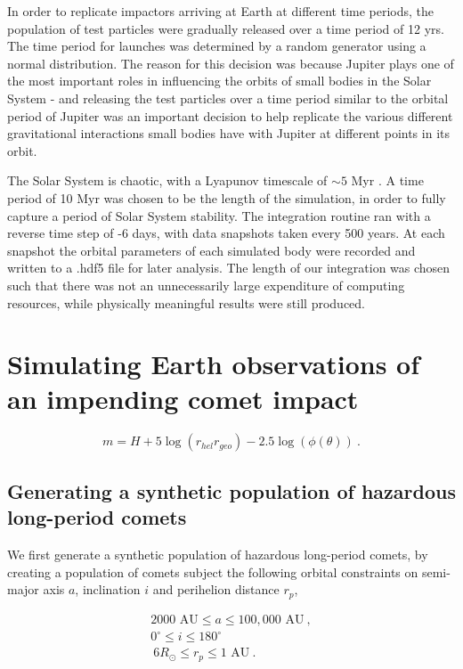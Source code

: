 In order to replicate impactors arriving at Earth at different time periods, the population of test particles were gradually released over a time period of 12 yrs. The time period for launches was determined by a random generator using a normal distribution.  The reason for this decision was because Jupiter plays one of the most important roles in influencing the orbits of small bodies in the Solar System - and releasing the test particles over a time period similar to the orbital period of Jupiter was an important decision to help replicate the various different gravitational interactions small bodies have with Jupiter at different points in its orbit.

The Solar System is chaotic, with a Lyapunov timescale of $\sim 5$ Myr \citep{1996CeMDA..64..115L}. A time period of 10 Myr was chosen to be the length of the simulation, in order to fully capture a period of Solar System stability. The integration routine ran with a reverse time step of -6 days, with data snapshots taken every 500 years. At each snapshot the orbital parameters of each simulated body were recorded and written to a .hdf5 file for later analysis. The length of our integration was chosen such that there was not an unnecessarily large expenditure of computing resources, while physically meaningful results were still produced.

\section{Simulating Earth observations of an impending comet impact}

\begin{equation}
    m = H + 5\log(r_{hel}r_{geo}) - 2.5\log(\phi(\theta))~.
\end{equation}




\iffalse

\subsection{Generating a synthetic population of hazardous long-period comets}

We first generate a synthetic population of hazardous long-period comets, by creating a population of comets subject the following orbital constraints on semi-major axis $a$, inclination $i$ and perihelion distance $r_p$,

\begin{equation}
    \begin{gathered}
        2000 \text{ AU} \leq a \leq 100,000 \text{ AU}~,\\
        0^{\circ} \leq i \leq 180^{\circ}~\\\
        6 R_\odot \leq r_p \leq 1 \text{ AU}~.
    \end{gathered}
\end{equation}

